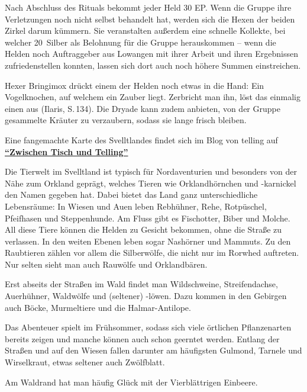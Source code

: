 
Nach Abschluss des Rituals bekommt jeder Held 30 EP.
Wenn die Gruppe ihre Verletzungen noch nicht selbst behandelt hat, werden sich die Hexen der beiden Zirkel darum kümmern.
Sie veranstalten außerdem eine schnelle Kollekte, bei welcher 20~Silber als Belohnung für die Gruppe herauskommen -- wenn die Helden noch Auftraggeber aus Lowangen mit ihrer Arbeit und ihren Ergebnissen zufriedenstellen konnten, lassen sich dort auch noch höhere Summen einstreichen. 

Hexer Bringimox drückt einem der Helden noch etwas in die Hand:
Ein Vogelknochen, auf welchem ein Zauber liegt. Zerbricht man ihn, löst das einmalig einen  aus (Ilaris, S.\,134).
Die Dryade kann zudem anbieten, von der Gruppe gesammelte Kräuter zu verzaubern, sodass sie lange frisch bleiben.

\neueseite


Eine fangemachte Karte des Svelltlandes findet sich im Blog von telling auf \href{https://tellingaventurien.home.blog/2023/02/27/karte-svelltland-um-1045-nach-bosparans-fall/}{\textbf{\enquote{Zwischen Tisch und Telling}}}

\label{svellt}
Die Tierwelt im Svelltland ist typisch für Nordaventurien und besonders von der Nähe zum Orkland geprägt, welches Tieren wie Orklandhörnchen und -karnickel den Namen gegeben hat. Dabei bietet das Land ganz unterschiedliche Lebensräume: In Wiesen und Auen leben Rebhühner, Rehe, Rotpüschel, Pfeifhasen und Steppenhunde. Am Fluss gibt es Fischotter, Biber und Molche. All diese Tiere können die Helden zu Gesicht bekommen, ohne die Straße zu verlassen. In den weiten Ebenen leben sogar Nashörner und Mammuts.
Zu den Raubtieren zählen vor allem die Silberwölfe, die nicht nur im Rorwhed auftreten. Nur selten sieht man auch Rauwölfe und Orklandbären.

Erst abseits der Straßen im Wald findet man Wildschweine, Streifendachse, Auerhühner, Waldwölfe und (seltener) -löwen. Dazu kommen in den Gebirgen auch Böcke, Murmeltiere und die Halmar-Antilope.

Das Abenteuer spielt im Frühsommer, sodass sich viele örtlichen Pflanzenarten bereits zeigen und manche können auch schon geerntet werden. Entlang der Straßen und auf den Wiesen fallen darunter am häufigsten Gulmond, Tarnele und Wirselkraut, etwas seltener auch Zwölfblatt.

Am Waldrand hat man häufig Glück mit der Vierblättrigen Einbeere.

